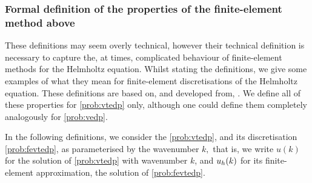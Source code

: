 





\subsubsection{Formal definition of the properties of the finite-element method above}\label{sec:femprops}

These definitions may seem overly technical, however their technical definition is necessary to capture the, at times, complicated behaviour of finite-element methods for the Helmholtz equation. Whilst stating the definitions, we give some examples of what they mean for finite-element discretisations of the Helmholtz equation. These definitions are based on, and developed from, \cite[Definition 2.3]{DiMoSp:19}. We define all of these properties for \cref{prob:vtedp} only, although one could define them completely analogously for \cref{prob:vedp}.

In the following definitions, we consider the \cref{prob:vtedp}, and its discretisation \cref{prob:fevtedp}, as parameterised by the wavenumber $k,$ that is, we write $u(k)$ for the solution of \cref{prob:vtedp} with wavenumber $k$, and $u_{h}(k)$ for its finite-element approximation, the solution of \cref{prob:fevtedp}.

